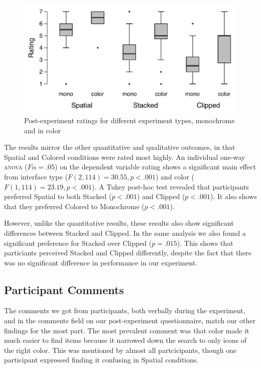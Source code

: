 \documentclass[nobib]{tufte-book} %
\begin{document}
\begin{figure}
  \includegraphics{post-color.pdf}
  \caption{Post-experiment ratings for different experiment types, monochrome and in color}
  \label{fig:post-color}
\end{figure}

The results mirror the other quantitative and qualitative outcomes, in that Spatial and Colored conditions were rated most highly. An individual one-way \textsc{anova} ($F\alpha = .05$) on the dependent variable rating shows a significant main effect from interface type ($F(2,114) = 30.55, p < .001$) and color ($F(1,114) = 23.19, p < .001$). A Tukey post-hoc test revealed that participants preferred Spatial to both Stacked ($p < .001$) and Clipped ($p < .001$). It also shows that they preferred Colored to Monochrome ($p < .001$).

However, unlike the quantitative results, these results also show significant differences between Stacked and Clipped. In the same analysis we also found a significant preference for Stacked over Clipped ($p = .015$). This shows that particiants perceived Stacked and Clipped differently, despite the fact that there was no significant difference in performance in our experiment.

\subsection{Participant Comments}
The comments we got from participants, both verbally during the experiment, and in the comments field on our post-experiment questionnaire, match our other findings for the most part. The most prevalent comment was that color made it much easier to find items because it narrowed down the search to only icons of the right color. This was mentioned by almost all partcicipants, though one participant expressed finding it confusing in Spatial conditions.
\end{document}
